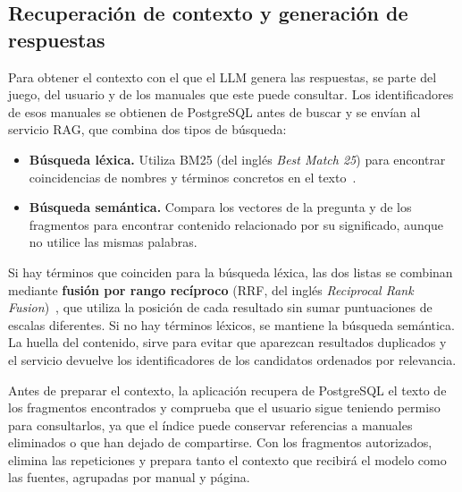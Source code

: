 
\FloatBarrier
\subsection{Recuperación de contexto y generación de respuestas}

Para obtener el contexto con el que el \ac{LLM} genera las respuestas,
se parte del juego, del usuario y de los manuales que este puede
consultar. Los identificadores de esos manuales se obtienen de
PostgreSQL antes de buscar y se envían al servicio \ac{RAG}, que
combina dos tipos de búsqueda:

\begin{itemize}
    \item \textbf{Búsqueda léxica.} Utiliza \acs{BM25} (del inglés
    \textit{Best Match 25}) para encontrar coincidencias
    de nombres y términos concretos en el
    texto~\cite[apdo.~11.4.3]{manning_bm25}.

    \item \textbf{Búsqueda semántica.} Compara los vectores de la
    pregunta y de los fragmentos para encontrar contenido relacionado
    por su significado, aunque no utilice las mismas palabras.
\end{itemize}

Si hay términos que coinciden para la búsqueda léxica, las dos listas se combinan mediante
\textbf{fusión por rango recíproco} (\acs{RRF}, del inglés \textit{Reciprocal
Rank Fusion})~\cite{cormack_rrf}, que utiliza la posición de cada
resultado sin sumar puntuaciones de escalas diferentes. Si no hay términos
léxicos, se mantiene la búsqueda semántica. La huella del
contenido, sirve para evitar que aparezcan resultados
duplicados y el servicio devuelve los identificadores
de los candidatos ordenados por relevancia.

Antes de preparar el contexto, la aplicación recupera de PostgreSQL el texto de los fragmentos encontrados y comprueba que el usuario sigue teniendo permiso para consultarlos, ya que el índice puede conservar referencias a manuales eliminados o que han dejado de compartirse. Con los fragmentos autorizados, elimina las repeticiones y prepara tanto el contexto que recibirá el modelo como las fuentes, agrupadas por manual y página.


